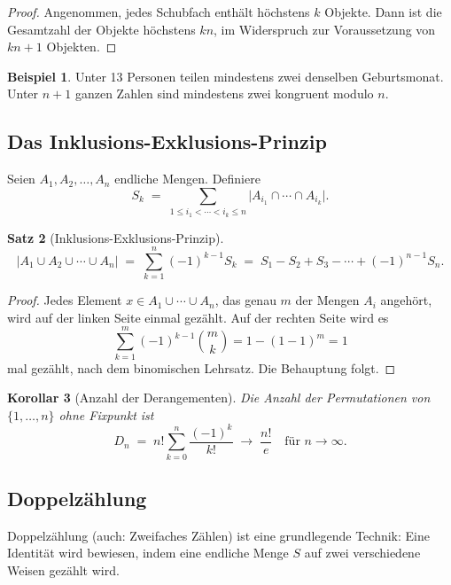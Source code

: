 \documentclass[12pt,a4paper]{amsart}
\newtheorem{theorem}{Satz}[section]
\newtheorem{corollary}[theorem]{Korollar}
\theoremstyle{definition}
\newtheorem{example}[theorem]{Beispiel}
\theoremstyle{remark}
\begin{document}
\begin{proof}
Angenommen, jedes Schubfach enth\"alt h\"ochstens $k$ Objekte.  Dann ist die
Gesamtzahl der Objekte h\"ochstens $kn$, im Widerspruch zur Voraussetzung von
$kn+1$ Objekten.
\end{proof}

\begin{example}
Unter 13 Personen teilen mindestens zwei denselben Geburtsmonat.
Unter $n+1$ ganzen Zahlen sind mindestens zwei kongruent modulo $n$.
\end{example}

\subsection{Das Inklusions-Exklusions-Prinzip}

Seien $A_1, A_2, \ldots, A_n$ endliche Mengen.  Definiere
\[
  S_k \;=\; \sum_{1 \le i_1 < \cdots < i_k \le n} \bigl|A_{i_1} \cap \cdots \cap A_{i_k}\bigr|.
\]

\begin{theorem}[Inklusions-Exklusions-Prinzip]\label{satz:inklusion-exklusion}
\[
  \bigl|A_1 \cup A_2 \cup \cdots \cup A_n\bigr|
  \;=\;
  \sum_{k=1}^{n}(-1)^{k-1} S_k
  \;=\;
  S_1 - S_2 + S_3 - \cdots + (-1)^{n-1}S_n.
\]
\end{theorem}

\begin{proof}
Jedes Element $x \in A_1 \cup \cdots \cup A_n$, das genau $m$ der Mengen $A_i$
angeh\"ort, wird auf der linken Seite einmal gez\"ahlt.  Auf der rechten Seite
wird es
\[
  \sum_{k=1}^{m}(-1)^{k-1}\binom{m}{k}
  = 1 - (1-1)^m = 1
\]
mal gez\"ahlt, nach dem binomischen Lehrsatz.  Die Behauptung folgt.
\end{proof}

\begin{corollary}[Anzahl der Derangementen]
Die Anzahl der Permutationen von $\{1,\ldots,n\}$ ohne Fixpunkt ist
\[
  D_n \;=\; n!\sum_{k=0}^{n}\frac{(-1)^k}{k!}
  \;\longrightarrow\; \frac{n!}{e} \quad \text{f\"ur } n\to\infty.
\]
\end{corollary}

\subsection{Doppelz\"ahlung}

Doppelz\"ahlung (auch: Zweifaches Z\"ahlen) ist eine grundlegende Technik:
Eine Identit\"at wird bewiesen, indem eine endliche Menge $S$ auf zwei
verschiedene Weisen gez\"ahlt wird.
\end{document}
